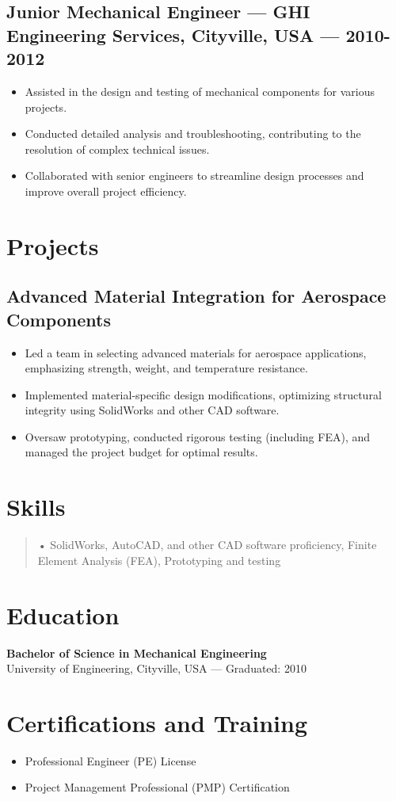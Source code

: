 \documentclass[a4paper,10pt]{article}
\begin{document}
\subsection*{Junior Mechanical Engineer --- GHI Engineering Services, Cityville, USA --- 2010-2012}

\begin{itemize}[left=0pt]
    \item Assisted in the design and testing of mechanical components for various projects.
    \item Conducted detailed analysis and troubleshooting, contributing to the resolution of complex technical issues.
    \item Collaborated with senior engineers to streamline design processes and improve overall project efficiency.
\end{itemize}

\section*{Projects}

\subsection*{Advanced Material Integration for Aerospace Components}

\begin{itemize}
    \item Led a team in selecting advanced materials for aerospace applications, emphasizing strength, weight, and temperature resistance.
    \item Implemented material-specific design modifications, optimizing structural integrity using SolidWorks and other CAD software.
    \item Oversaw prototyping, conducted rigorous testing (including FEA), and managed the project budget for optimal results.
\end{itemize}


\section*{Skills}
\begin{quote}
    • SolidWorks, AutoCAD, and other CAD software proficiency, Finite Element Analysis (FEA), Prototyping and testing
\end{quote}

\section*{Education}
\textbf{Bachelor of Science in Mechanical Engineering}\\
University of Engineering, Cityville, USA --- Graduated: 2010

\section*{Certifications and Training}
\begin{itemize}
    \item Professional Engineer (PE) License
    \item Project Management Professional (PMP) Certification
\end{itemize}
\end{document}
